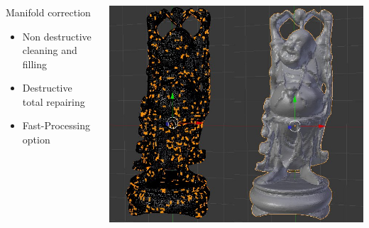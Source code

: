 \documentclass{beamer}
\begin{document}
\begin{frame}
	\frametitle{}

    \begin{columns}[t]
  	\begin{column}{5cm}
        \begin{block}{Manifold correction}
		    \begin{itemize}
			    \item Non destructive cleaning and filling
			    \item Destructive total repairing
			    \item Fast-Processing option
		    \end{itemize}
        \end{block}
    \end{column}

    \begin{column}{6cm}
        \begin{center}
		    \includegraphics[height=.7\textheight]{repair}
	    \end{center}
    \end{column}

    \end{columns}
\end{frame}
\end{document}
